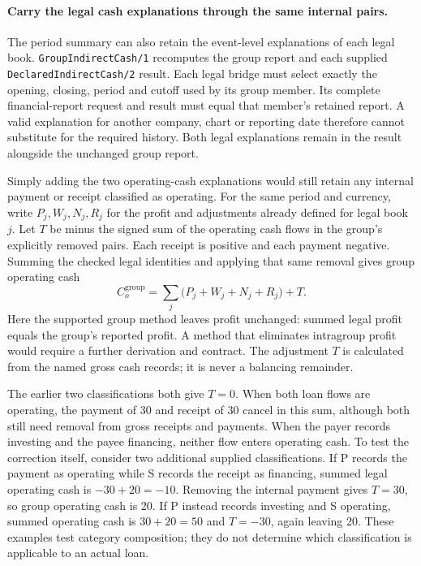 \paragraph{Carry the legal cash explanations through the same internal pairs.}
The period summary can also retain the event-level explanations of each legal
book. \texttt{GroupIndirectCash/1} recomputes the group report and each supplied
\texttt{DeclaredIndirectCash/2} result. Each legal bridge must select exactly the
opening, closing, period and cutoff used by its group member. Its complete
financial-report request and result must equal that member's retained report.
A valid explanation for another company, chart or reporting date therefore
cannot substitute for the required history. Both legal explanations remain in
the result alongside the unchanged group report.

Simply adding the two operating-cash explanations would still retain any
internal payment or receipt classified as operating. For the same period and
currency, write $P_j,W_j,N_j,R_j$ for the profit and adjustments already defined
for legal book $j$. Let $T$ be minus the signed sum of the operating cash flows
in the group's explicitly removed pairs. Each receipt is positive and each
payment negative. Summing the checked legal identities and applying that same
removal gives group operating cash
\[
 C_o^{\mathrm{group}}
 =\sum_j\bigl(P_j+W_j+N_j+R_j\bigr)+T.
\]
Here the supported group method leaves profit unchanged: summed legal profit
equals the group's reported profit. A method that eliminates intragroup profit
would require a further derivation and contract. The adjustment $T$ is calculated
from the named gross cash records; it is never a balancing remainder.

The earlier two classifications both give $T=0$. When both loan flows are
operating, the payment of 30 and receipt of 30 cancel in this sum, although both
still need removal from gross receipts and payments. When the payer records
investing and the payee financing, neither flow enters operating cash. To test
the correction itself, consider two additional supplied classifications. If P
records the payment as operating while S records the receipt as financing,
summed legal operating cash is $-30+20=-10$. Removing the internal payment
gives $T=30$, so group operating cash is 20. If P instead records investing
and S operating, summed operating cash is $30+20=50$ and $T=-30$, again leaving
20. These examples test category composition; they do not determine which
classification is applicable to an actual loan.

